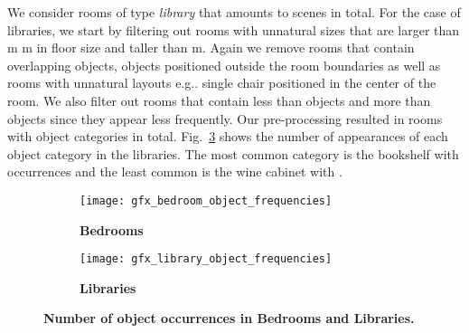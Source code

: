 \documentclass{article}
\makeatletter
\DeclareRobustCommand\onedot{\futurelet\@let@token\@onedot}
\def\@onedot{\ifx\@let@token.\else.\null\fi\xspace}
\def\eg{e.g\onedot} \def\Eg{E.g\onedot}
\newcommand{\boldparagraph}[1]{\vspace{0.2cm}\noindent{\bf #1:} }
\newcommand{\figref}[1]{Fig.~\ref{#1}}
\makeatother
\begin{document}
\boldparagraph{Library}We consider rooms of type \emph{library} that amounts to  scenes in total.
For the case of libraries, we start by filtering out rooms with unnatural sizes
that are larger than m  m in floor size and taller than m.
Again we remove rooms that contain overlapping objects, objects positioned
outside the room boundaries as well as rooms with unnatural layouts \eg
single chair positioned in the center of the room. We also filter out rooms
that contain less than  objects and more than  objects since they appear
less frequently. Our pre-processing resulted in  rooms with  object categories 
in total. \figref{fig:library_object_frequencies} shows the number of
appearances of each object category in the  libraries. The most common
category is the bookshelf with  occurrences and the least common is the
wine cabinet with .
\begin{figure}[h!]
    \begin{subfigure}[t]{0.5\textwidth}
        \centering
        \texttt{[image: gfx\_bedroom\_object\_frequencies]}
        \vspace{-1.2em}
        \caption{{\bf{Bedrooms}}}
        \label{fig:bedroom_object_frequencies}
    \end{subfigure}\begin{subfigure}[t]{0.5\textwidth}
        \centering
        \texttt{[image: gfx\_library\_object\_frequencies]}
        \vspace{-1.2em}
        \caption{{\bf{Libraries}}}
        \label{fig:library_object_frequencies}
    \end{subfigure}
    \caption{\bf{Number of object occurrences in Bedrooms and Libraries.}}
    \vspace{-1.2em}
\end{figure}
\end{document}
